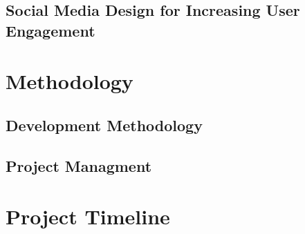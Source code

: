 \documentclass[12pt,titlepage]{article}
\begin{document}
  \subsection{Social Media Design for Increasing User Engagement}

\section{Methodology}

  \subsection{Development Methodology}

  \subsection{Project Managment}

\section{Project Timeline}
\end{document}
